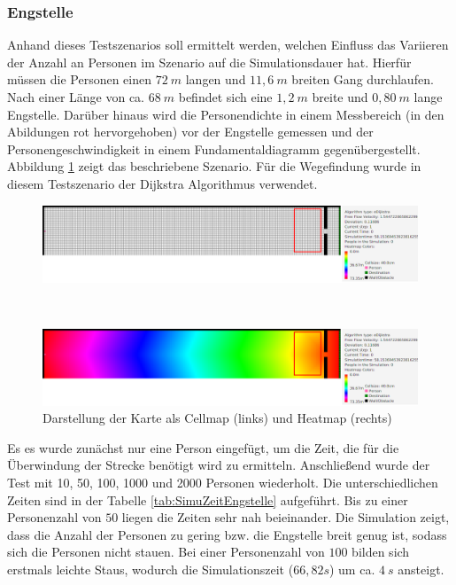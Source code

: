 \subsubsection{Engstelle}
Anhand dieses Testszenarios soll ermittelt werden, welchen Einfluss das Variieren der Anzahl an Personen im Szenario auf die Simulationsdauer hat. Hierfür müssen die Personen einen $72\ m$ langen und $11,6\ m$ breiten Gang durchlaufen. Nach einer Länge von ca. $68\ m$ befindet sich eine $1,2\ m$ breite und $0,80\ m$ lange Engstelle.
Darüber hinaus wird die Personendichte in einem Messbereich (in den Abildungen rot hervorgehoben) vor der Engstelle gemessen und der Personengeschwindigkeit in einem Fundamentaldiagramm gegenübergestellt. Abbildung \ref{fig:engstelleMAP} zeigt das beschriebene Szenario. Für die Wegefindung wurde in diesem Testszenario der Dijkstra Algorithmus verwendet. 

\begin{figure}
\centering
\begin{minipage}{1\textwidth}
\centering
  \includegraphics[width=1\linewidth]{abbildungen/engstelle/engstelleMAP.png}
\end{minipage}%
\\
\begin{minipage}{1\textwidth}
\centering
  \includegraphics[width=1\linewidth]{abbildungen/engstelle/engstelleHEATMAP.png}
\end{minipage}
\caption{Darstellung der Karte als Cellmap (links) und Heatmap (rechts)}
\label{fig:engstelleMAP}
\end{figure}

Es es wurde zunächst nur eine Person eingefügt, um die Zeit, die für die Überwindung der Strecke benötigt wird zu ermitteln. Anschließend wurde der Test mit 10, 50, 100, 1000 und 2000 Personen wiederholt. Die unterschiedlichen Zeiten sind in der Tabelle \ref{tab:SimuZeitEngstelle} aufgeführt. Bis zu einer Personenzahl von $50$ liegen die Zeiten sehr nah beieinander. Die Simulation zeigt, dass die Anzahl der Personen zu gering bzw. die Engstelle breit genug ist, sodass sich die Personen nicht stauen. Bei einer Personenzahl von $100$ bilden sich erstmals leichte Staus, wodurch die Simulationszeit ($66,82 s$) um ca. $4\ s$ ansteigt.\\

